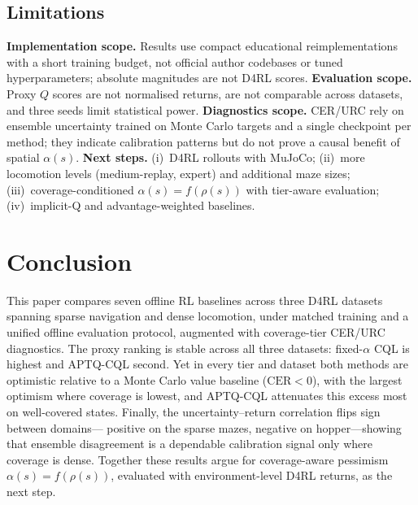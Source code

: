 \documentclass[conference]{IEEEtran}
\begin{document}
\subsection{Limitations}

\textbf{Implementation scope.} Results use compact educational
reimplementations with a short training budget, not official author
codebases or tuned hyperparameters; absolute magnitudes are not D4RL scores.
\textbf{Evaluation scope.} Proxy $Q$ scores are not normalised returns, are
not comparable across datasets, and three seeds limit statistical power.
\textbf{Diagnostics scope.} CER/URC rely on ensemble uncertainty trained on
Monte Carlo targets and a single checkpoint per method; they indicate
calibration patterns but do not prove a causal benefit of spatial
$\alpha(s)$. \textbf{Next steps.} (i)~D4RL rollouts with MuJoCo; (ii)~more
locomotion levels (medium-replay, expert) and additional maze sizes;
(iii)~coverage-conditioned $\alpha(s){=}f(\rho(s))$ with tier-aware
evaluation; (iv)~implicit-Q and advantage-weighted baselines.

\section{Conclusion}
\label{sec:conclusion}

This paper compares seven offline RL baselines across three D4RL datasets
spanning sparse navigation and dense locomotion, under matched training and a
unified offline evaluation protocol, augmented with coverage-tier CER/URC
diagnostics. The proxy ranking is stable across all three datasets:
fixed-$\alpha$ CQL is highest and APTQ-CQL second. Yet in every tier and
dataset both methods are optimistic relative to a Monte Carlo value
baseline ($\mathrm{CER}{<}0$), with the largest optimism where coverage is
lowest, and APTQ-CQL attenuates this excess most on well-covered states.
Finally, the uncertainty--return correlation flips sign between domains---
positive on the sparse mazes, negative on hopper---showing that ensemble
disagreement is a dependable calibration signal only where coverage is
dense. Together these results argue for coverage-aware pessimism
$\alpha(s){=}f(\rho(s))$, evaluated with environment-level D4RL returns, as
the next step.
\end{document}
